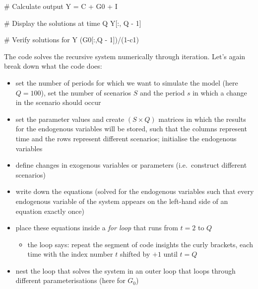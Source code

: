 \documentclass[
  letterpaper,
  DIV=11,
  numbers=noendperiod]{scrreprt}
\newenvironment{Shaded}{\begin{snugshade}}{\end{snugshade}}
\newcommand{\CommentTok}[1]{\textcolor[rgb]{0.37,0.37,0.37}{#1}}
\newcommand{\DecValTok}[1]{\textcolor[rgb]{0.68,0.00,0.00}{#1}}
\newcommand{\NormalTok}[1]{\textcolor[rgb]{0.00,0.23,0.31}{#1}}
\newcommand{\OperatorTok}[1]{\textcolor[rgb]{0.37,0.37,0.37}{#1}}
\providecommand{\tightlist}{%
  \setlength{\itemsep}{0pt}\setlength{\parskip}{0pt}}\usepackage{longtable,booktabs,array}
\begin{document}
\begin{tcolorbox}
\begin{Shaded}
\begin{Highlighting}[]
\CommentTok{\# Calculate output}
\NormalTok{Y }\OperatorTok{=}\NormalTok{ C }\OperatorTok{+}\NormalTok{ G0 }\OperatorTok{+}\NormalTok{ I}

\CommentTok{\# Display the solutions at time Q}
\NormalTok{Y[:, Q }\OperatorTok{{-}} \DecValTok{1}\NormalTok{]}

\CommentTok{\# Verify solutions for Y}
\NormalTok{(G0[:,Q }\OperatorTok{{-}} \DecValTok{1}\NormalTok{])}\OperatorTok{/}\NormalTok{(}\DecValTok{1}\OperatorTok{{-}}\NormalTok{c1)}
\end{Highlighting}
\end{Shaded}

\end{tcolorbox}

The code solves the recursive system numerically through iteration.
Let's again break down what the code does:

\begin{itemize}
\item
  set the number of periods for which we want to simulate the model
  (here \(Q=100\)), set the number of scenarios \(S\) and the period
  \(s\) in which a change in the scenario should occur
\item
  set the parameter values and create \((S \times Q)\) matrices in which
  the results for the endogenous variables will be stored, such that the
  columns represent time and the rows represent different scenarios;
  initialise the endogenous variables
\item
  define changes in exogenous variables or parameters (i.e.~construct
  different scenarios)
\item
  write down the equations (solved for the endogenous variables such
  that every endogenous variable of the system appears on the left-hand
  side of an equation exactly once)
\item
  place these equations inside a \emph{for loop} that runs from \(t=2\)
  to \(Q\)

  \begin{itemize}
  \tightlist
  \item
    the loop says: repeat the segment of code insights the curly
    brackets, each time with the index number \(t\) shifted by \(+1\)
    until \(t=Q\)
  \end{itemize}
\item
  nest the loop that solves the system in an outer loop that loops
  through different parameterisations (here for \(G_0\))
\end{itemize}
\end{document}
